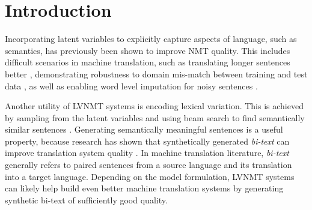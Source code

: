 
\chapter{Introduction}
\label{ch:Introduction}

Incorporating latent variables to explicitly capture aspects of language, such as semantics, has previously been shown to improve \ac{NMT} quality. This includes difficult scenarios in machine translation, such as translating longer sentences better \cite{Zhang2016VNMT, harshil2018GNMT, Su2018VRNMT}, demonstrating robustness to domain mis-match between training and test data \cite{eikema2018AEVNMT}, as well as enabling word level imputation for noisy sentences \cite{harshil2018GNMT}. 

Another utility of \ac{LVNMT} systems is encoding lexical variation. This is achieved by sampling from the latent variables and using beam search to find semantically similar sentences \cite{schulz2018StochasticDecoder, shen2019diverse}. Generating semantically meaningful sentences is a useful property, because research has shown that synthetically generated \textit{bi-text} can improve translation system quality \cite{sennrich2015ImprovingNMT, edunov2018understandigBackTrans}. In machine translation literature, \textit{bi-text} generally refers to paired sentences from a source language and its translation into a target language. Depending on the model formulation, \ac{LVNMT} systems can likely help build even better machine translation systems by generating synthetic bi-text of sufficiently good quality. 


